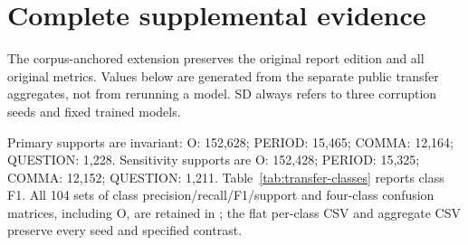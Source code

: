 \clearpage
\section{Complete supplemental evidence}\label{app:transfer}
The corpus-anchored extension preserves the original report edition and all
original metrics. Values below are generated from the separate public transfer
aggregates, not from rerunning a model. SD always refers to three corruption
seeds and fixed trained models.

\begin{table}[h]
\centering\footnotesize\setlength{\tabcolsep}{3pt}
\caption{Complete supplemental overlap-sensitivity matrix, macro-F1 (\%).
The same predictions are filtered to 14,445 rows /181,116 targets.}
\TransferSensitivity
\end{table}

\begin{table}[h]
\centering\footnotesize\setlength{\tabcolsep}{3pt}
\caption{All primary own-clean-anchor drops (pp). Positive means deterioration.
Absolute noisy-score advantages and smaller own-anchor drops are distinct.}
\TransferDrops
\end{table}

\begin{table}[h]
\centering\footnotesize
\caption{All models' partial-minus-word-mask-matched-full macro-F1 (pp).
Word dose is matched; character dose is not.}
\TransferControl
\end{table}

{\raggedright
Primary supports are invariant: O: 152,628; PERIOD: 15,465; COMMA: 12,164;
QUESTION: 1,228. Sensitivity supports are O: 152,428; PERIOD: 15,325; COMMA: 12,152;
QUESTION: 1,211. Table~\ref{tab:transfer-classes} reports class F1. All 104 sets of
class precision/recall/F1/support and four-class confusion matrices, including
O, are retained in ; the
flat per-class CSV and aggregate CSV preserve every seed and specified contrast.
\par}

\clearpage
\begin{table}[h]
\centering\footnotesize\setlength{\tabcolsep}{3pt}
\caption{Complete supplemental primary class F1 (\%). Clean has one value;
noisy conditions use mean $\pm$ sample SD. Rare QUESTION support is explicit
above, and unfavorable PERIOD contrasts are retained.}
\label{tab:transfer-classes}
\TransferClasses
\end{table}

